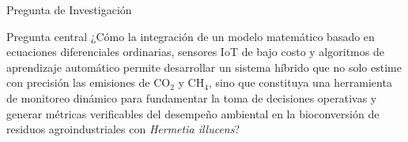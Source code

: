 \documentclass[aspectratio=169, 11pt]{beamer}
\begin{document}
\begin{frame}{Pregunta de Investigación}
\begin{alertblock}{Pregunta central}
\centering
\large
¿Cómo la integración de un modelo matemático basado en ecuaciones diferenciales ordinarias, sensores IoT de bajo costo y algoritmos de aprendizaje automático permite desarrollar un sistema híbrido que no solo estime con precisión las emisiones de CO$_2$ y CH$_4$, sino que constituya una herramienta de monitoreo dinámico para fundamentar la toma de decisiones operativas y generar métricas verificables del desempeño ambiental en la bioconversión de residuos agroindustriales con \textit{Hermetia illucens}?
\end{alertblock}
\end{frame}
\end{document}
